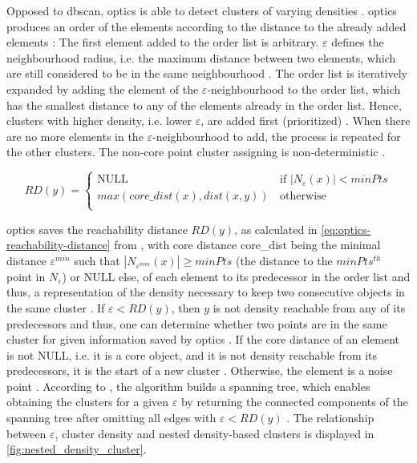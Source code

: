 Opposed to \ac{dbscan}, \ac{optics} is able to detect clusters of varying densities \cite{OPTICS2014}.
\ac{optics} produces an order of the elements according to the distance to the already added elements \cite{OPTICS2014, OPTICS2013}:
The first element added to the order list is arbitrary.
$\varepsilon$ defines the neighbourhood radius, i.e. the maximum distance between two elements, which are still considered to be in the same neighbourhood \cite{OPTICS_kMeans_2016}.
The order list is iteratively expanded by adding the element of the $\varepsilon$-neighbourhood to the order list, which has the smallest distance to any of the elements already in the order list.
Hence, clusters with higher density, i.e. lower $\varepsilon$, are added first (prioritized) \cite{OPTICS_kMeans_2016, OPTICS1999}.
When there are no more elements in the $\varepsilon$-neighbourhood to add, the process is repeated for the other clusters.
The non-core point cluster assigning is non-deterministic \cite{OPTICS2013}.

\begin{equation}
    RD(y) = \left\{
    \begin{array}{ll}
    \textrm{NULL} & \, \textrm{if |}N_\varepsilon (x)| < minPts \\
    max(core\_dist(x), dist(x,y)) & \, \textrm{otherwise} \\
    \end{array}
    \right. 
    \label{eq:optics-reachability-distance}
\end{equation}

\ac{optics} saves the reachability distance $RD(y)$, as calculated in \autoref{eq:optics-reachability-distance} from \cite{OPTICS2013},
with core distance core\_dist being the minimal distance $\varepsilon^{min}$ such that $| N_{\varepsilon^{min}} (x) | \geq minPts$ 
(the distance to the $minPts^{th}$ point in $N_\varepsilon$) or NULL else, 
of each element to its predecessor in the order list and thus, 
a representation of the density necessary to keep two consecutive objects in the same cluster \cite{OPTICS2013}.
If $\varepsilon < RD(y)$, then $y$ is not density reachable from any of its predecessors and thus, 
one can determine whether two points are in the same cluster for given information saved by \ac{optics} \cite{OPTICS2013, OPTICS1999}.
If the core distance of an element is not NULL, i.e. it is a core object, and it is not density reachable from its predecessors, it is the start of a new cluster \cite{OPTICS1999}.
Otherwise, the element is a noise point \cite{OPTICS1999}.
According to \citeauthor{OPTICS2013}, the algorithm builds a spanning tree, which enables obtaining the clusters for a given $\varepsilon$ by returning the connected components 
of the spanning tree after omitting all edges with $\varepsilon < RD(y)$ \cite{OPTICS2013}.
The relationship between $\varepsilon$, cluster density and nested density-based clusters is displayed in \autoref{fig:nested_density_cluster}.

